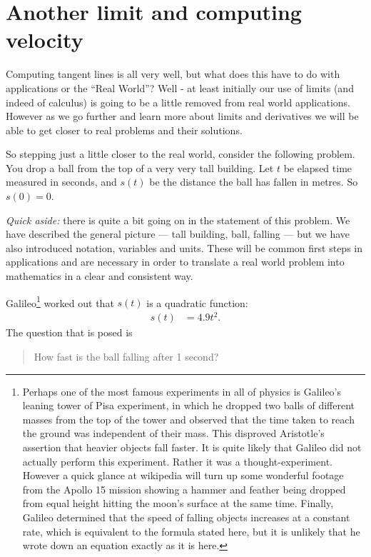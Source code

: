 \section{Another limit and computing velocity} \label{sec velocity}
Computing tangent lines is all very well, but what does this have to do with
applications or the ``Real World''? Well - at least initially our use of limits
(and indeed of calculus) is going to be a little removed from real world
applications. However as we go further and learn more about limits and
derivatives we will be able to get closer to real problems and their solutions.

So stepping just a little closer to the real world, consider the following
problem. You drop a ball from the top of a very very tall building. Let $t$ be
elapsed time measured in seconds, and $s(t)$ be the distance the ball has fallen
in metres. So $s(0) = 0$.

\emph{Quick aside:} there is quite a bit going on in the statement of this
problem. We have described the general picture --- tall building, ball, falling
--- but we have also introduced notation, variables and units. These will be
common first steps in applications and are necessary in order to translate a
real world problem into mathematics in a clear and consistent way.


Galileo\footnote{Perhaps one of the most famous experiments in all of physics
is Galileo's leaning tower of Pisa experiment, in which he dropped two balls
of different masses from the top of the tower and observed that the time
taken to reach the ground was independent of their mass. This
disproved Aristotle's assertion that heavier objects fall faster. It is quite
likely that Galileo did not actually perform this experiment. Rather it was a
thought-experiment. However a quick glance at wikipedia will turn up some
wonderful footage from the Apollo 15 mission showing a hammer and feather being
dropped from equal height hitting the moon's surface at the same time.
Finally, Galileo determined that the speed of falling objects increases at a
constant rate, which is equivalent to the formula stated here, but it is
unlikely that he wrote down an equation exactly as it is here.}
worked out that $s(t)$ is a quadratic function:
\begin{align*}
  s(t) &= 4.9 t^2.
\end{align*}
The question that is posed is
\begin{quote}
 How fast is the ball falling after 1 second?
\end{quote}

